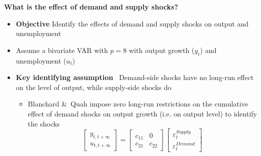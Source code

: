 \begin{frame}
{\textbf{What is the effect of demand and supply shocks?}}\bigskip

\begin{itemize}
\item \textbf{Objective} Identify the effects of demand and supply shocks on
output and unemployment\bigskip \pause

\item Assume a bivariate VAR with $p=8$ with output growth ($y_{t}$) and
unemployment ($u_{t}$)\bigskip

\item \textbf{Key identifying assumption} \ Demand-side shocks have no
long-run effect on the level of output, while supply-side shocks do\smallskip

\begin{itemize}
\item Blanchard \&\ Quah impose zero long-run restrictions on the cumulative
effect of demand shocks on output growth (i.e. on output level) to identify
the shocks\medskip 
\begin{equation*}
\begin{bmatrix}
y_{t,t+\infty } \\ 
u_{t,t+\infty }%
\end{bmatrix}%
=\left[ 
\begin{array}{cc}
c_{11} & 0 \\ 
c_{21} & c_{22}%
\end{array}%
\right] 
\begin{bmatrix}
\varepsilon _{t}^{Supply} \\ 
\varepsilon _{t}^{Demand}%
\end{bmatrix}%
\end{equation*}
\end{itemize}
\end{itemize}
\end{frame}


